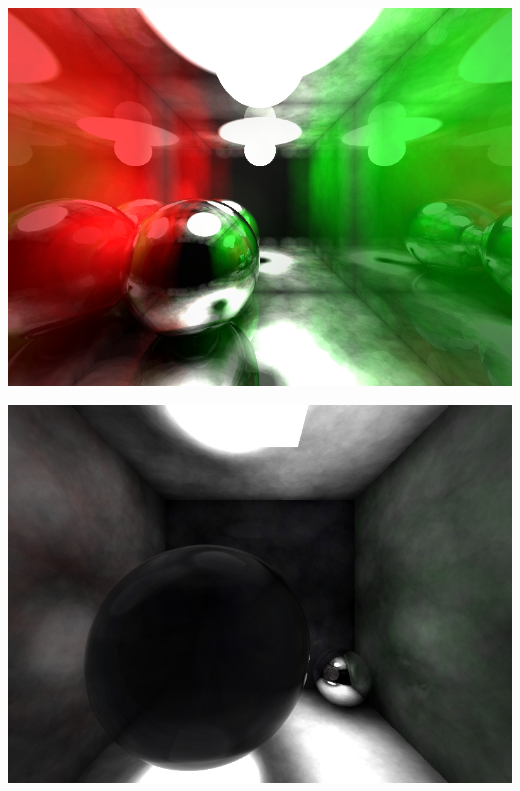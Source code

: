 \documentclass[a4paper]{article}
\begin{document}
\begin{center}
	\includegraphics[scale=0.45]{images/gallery/color_bleed.png}
	\label{fig:caustics}
\end{center}

\begin{center}
	\includegraphics[scale=0.45]{images/gallery/caustics.png}
	\label{fig:caustics}
\end{center}
\end{document}
